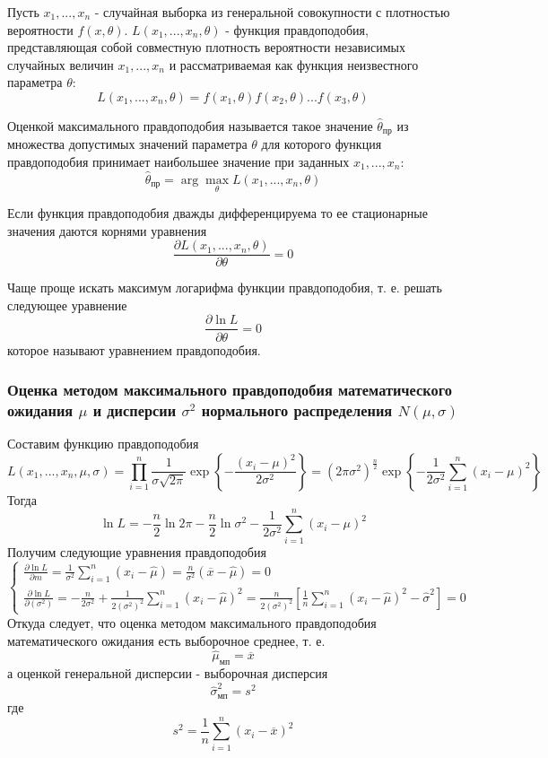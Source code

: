 \documentclass[a4paper, 12pt]{article}
\begin{document}
Пусть $x_1,...,x_n$ - случайная выборка из генеральной совокупности с плотностью вероятности $f(x, \theta)$. $L(x_1,...,x_n,\theta)$ - функция правдоподобия, представляющая собой совместную плотность вероятности независимых случайных величин $x_1,...,x_n$ и рассматриваемая как функция неизвестного параметра $\theta$:
$$
L(x_1,...,x_n,\theta)=f(x_1,\theta)f(x_2,\theta)...f(x_3,\theta)
$$

Оценкой максимального правдоподобия называется такое значение $\widehat{\theta}_{\mbox{пр}}$ из множества допустимых значений параметра $\theta$ для которого функция правдоподобия принимает наибольшее значение при заданных $x_1,...,x_n$:
$$
\widehat{\theta}_{\mbox{пр}} = \arg \max_\theta L(x_1,...,x_n,\theta)
$$

Если функция правдоподобия дважды дифференцируема то ее стационарные значения даются корнями уравнения 
$$
\frac{\partial L(x_1,...,x_n,\theta)}{\partial \theta} = 0
$$

Чаще проще искать максимум логарифма функции правдоподобия, т. е. решать следующее уравнение
$$
\frac{\partial \ln L}{\partial \theta} = 0
$$
которое называют уравнением правдоподобия.

\subsubsection{Оценка методом максимального правдоподобия математического ожидания $\mu$ и дисперсии $\sigma^2$ нормального распределения $N(\mu,\sigma)$}

Составим функцию правдоподобия
$$
L(x_1,...,x_n,\mu,\sigma) = \prod^n_{i=1} \frac{1}{\sigma\sqrt{2\pi}} \exp \left \{ - \frac{(x_i - \mu)^2}{2\sigma^2} \right \} = (2\pi\sigma^2)^{\frac{n}{2}} \exp \left \{ - \frac{1}{2\sigma^2} \sum^n_{i=1} (x_i - \mu)^2 \right \} 
$$
Тогда
$$
\ln L = -\frac{n}{2} \ln 2\pi - \frac{n}{2} \ln \sigma^2 - \frac{1}{2\sigma^2} \sum^n_{i=1} (x_i - \mu)^2
$$
Получим следующие уравнения правдоподобия
$$
\left \{ \begin{array}{ll}
\frac{\partial \ln L}{\partial m} = \frac{1}{\sigma^2} \sum^n_{i=1} (x_i - \widehat{\mu}) = \frac{n}{\sigma^2}(\overline{x} - \widehat{\mu}) = 0 \\
\frac{\partial \ln L}{\partial (\sigma^2)} = - \frac{n}{2\sigma^2} + \frac{1}{2(\sigma^2)^2}\sum^n_{i=1} (x_i - \widehat{\mu})^2 = \frac{n}{2(\sigma^2)^2} \left[ \frac{1}{n} \sum^n_{i=1} (x_i - \widehat{\mu})^2 - \widehat{\sigma}^2 \right] = 0
\end{array} \right.
$$
Откуда следует, что оценка методом максимального правдоподобия математического ожидания есть выборочное среднее, т. е.
\begin{equation}
\widehat{\mu}_{\mbox{мп}} = \overline{x}
\label{eq:1}
\end{equation}
а оценкой генеральной дисперсии - выборочная дисперсия
\begin{equation}
\widehat{\sigma}^2_{\mbox{мп}} = s^2
\label{eq:2}
\end{equation}
где 
$$
s^2 = \frac{1}{n}\sum^n_{i=1} (x_i - \overline{x})^2
$$
\end{document}
